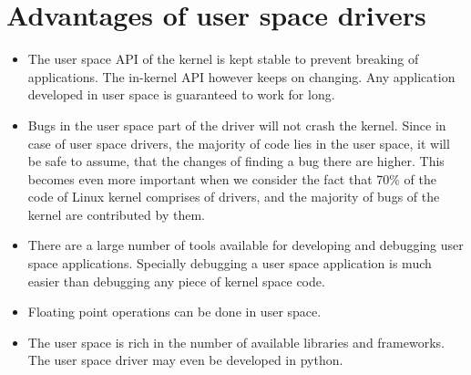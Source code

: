 \documentclass[twoside]{iitbreport}
\begin{document}
\section{Advantages of user space drivers}
\begin{itemize}
\item The user space API of the kernel is kept stable to prevent breaking of applications. The in-kernel API however keeps on changing. Any application developed in user space is guaranteed to work for long.
\item Bugs in the user space part of the driver will not crash the kernel. Since in case of user space drivers, the majority of code lies in the user space, it will be safe to assume, that the changes of finding a bug there are higher. This becomes even more important when we consider the fact that 70\% of the code of Linux kernel comprises of drivers, and the majority of bugs of the kernel are contributed by them\cite{Chou2001AnErrors}.
\item There are a large number of tools available for developing and debugging user space applications. Specially debugging a user space application is much easier than debugging any piece of kernel space code.
\item Floating point operations can be done in user space.
\item The user space is rich in the number of available libraries and frameworks. The user space driver may even be developed in python.
\end{itemize}
\end{document}
